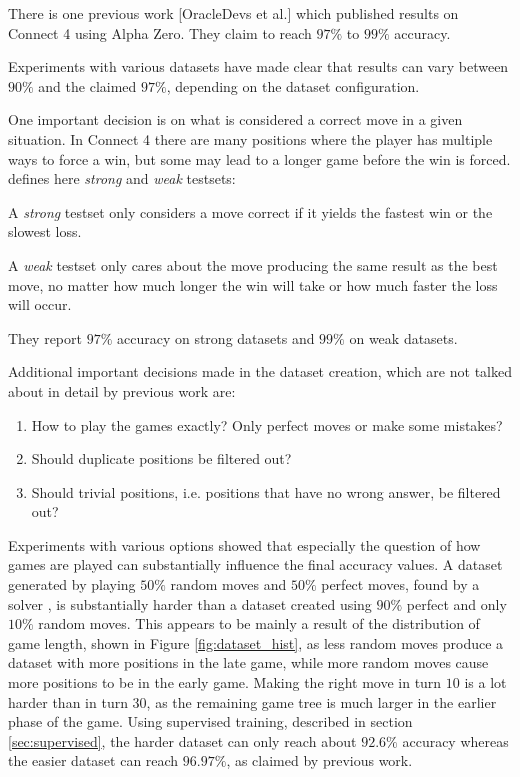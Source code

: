 \documentclass[12pt,onecolumn,oneside,titlepage]{article}
\begin{document}
There is one previous work \cite{oracledevs}[OracleDevs et al.] which published results on Connect 4 using Alpha Zero. They claim to reach $97\%$ to $99\%$ accuracy.

Experiments with various datasets have made clear that results can vary between $90\%$ and the claimed $97\%$, depending on the dataset configuration.

One important decision is on what is considered a correct move in a given situation. In Connect 4 there are many positions where the player has multiple ways to force a win, but some may lead to a longer game before the win is forced.
\cite{oracledevs} defines here \emph{strong} and \emph{weak} testsets: 

A \emph{strong} testset only considers a move correct if it yields the fastest win or the slowest loss. 

A \emph{weak} testset only cares about the move producing the same result 
as the best move, no matter how much longer the win will take or how much faster the loss will occur.

They report $97\%$ accuracy on strong datasets and $99\%$ on weak datasets.

Additional important decisions made in the dataset creation, which are not talked about in detail by previous work are:

\begin{enumerate}
 \item How to play the games exactly? Only perfect moves or make some mistakes?
 \item Should duplicate positions be filtered out?
 \item Should trivial positions, i.e. positions that have no wrong answer, be filtered out?
\end{enumerate}

Experiments with various options showed that especially the question of how games are played can substantially influence the final accuracy values. A dataset generated by playing $50\%$ random moves and $50\%$ perfect moves, found
by a solver \cite{pascalsolver, pascalsolvergithub}, is substantially harder than a dataset created using
$90\%$ perfect and only $10\%$ random moves. This appears to be mainly a result of the distribution of game length, shown in Figure \ref{fig:dataset_hist}, as less random moves produce a dataset with more positions in the late game, while more random moves cause more positions to be in the early game.
Making the right move in turn $10$ is a lot harder than in turn $30$, as the remaining game tree is much larger in the earlier phase of the game. Using supervised training, described in section \ref{sec:supervised}, the harder dataset can only reach about $92.6\%$ accuracy whereas the easier dataset
can reach $96.97\%$, as claimed by previous work. 
\end{document}
